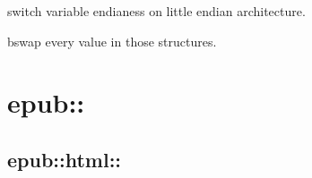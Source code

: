 \documentclass[letterpaper,10pt,english]{sphinxmanual}
\begin{document}

\begin{fulllineitems}
\label{functions:bswap__uint32_tR}
\end{fulllineitems}


\begin{fulllineitems}
\label{functions:bswap__uint64_tR}
switch variable endianess on little endian architecture.

\end{fulllineitems}


\begin{fulllineitems}
\label{functions:unretardify_header__st_palmdoc_dbR}
\end{fulllineitems}


\begin{fulllineitems}
\label{functions:unretardify_header__st_palmdocR}
\end{fulllineitems}


\begin{fulllineitems}
\label{functions:unretardify_header__st_mobiR}
bswap every value in those structures.

\end{fulllineitems}



\chapter{epub::}
\label{epub:epub}\label{epub::doc}

\section{epub::html::}
\label{tidyhtml:epub-html}\label{tidyhtml::doc}
\end{document}
